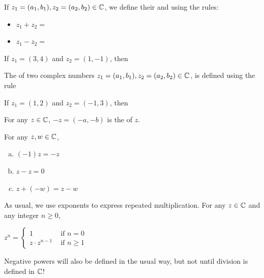 \documentclass[11pt,fleqn,dvipsnames,usenames]{article}
\begin{document}
\begin{definition}
If $z_{1} = (a_{1},b_{1}), z_{2} = (a_{2},b_{2})\in\mathbb{C}$, we define their  and  using the rules:
\begin{itemize}
\item $z_{1} + z_{2} =$
\vsmsp

\item $z_{1} - z_{2} =$
\end{itemize}
\end{definition}

\begin{example}
If $z_{1} = (3,4)$ and $z_{2} = (1,-1)$, then
\end{example}
\vspace{3cm}

\begin{definition}\label{complexmultiplication}
The  of two complex numbers $z_{1} = (a_{1},b_{1}), z_{2} = (a_{2},b_{2})\in\mathbb{C}$, is defined using the rule
\vspace{2cm}
\end{definition}

\begin{example}\label{examplecomplexmultiplication}
If $z_{1} = (1,2)$ and $z_{2} = (-1,3)$, then
\end{example}
\vspace{3cm}

\notation For any $z\in\mathbb{C}$, $-z = (-a,-b)$ is the  of $z$.
\vsp

\properties For any $z,w\in\mathbb{C}$,
\begin{enumerate}[(a)]
\item $(-1)z = -z$
\item $z - z = 0$
\item $z + (-w) = z - w$
\end{enumerate}
\newpage

\notation As usual, we use exponents to express repeated multiplication.  For any $z\in\mathbb{C}$ and any integer $n\geq 0$,
\begin{center}
$z^{n} = \begin{cases} 1 & \text{ if }n = 0\\z\cdot z^{n-1} &\text{ if }n \geq 1\end{cases}$
\end{center}

\note Negative powers will also be defined in the usual way, but not until division is defined in $\mathbb{C}$!
\end{document}
